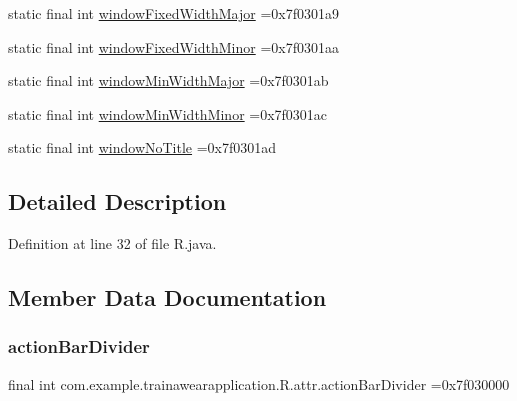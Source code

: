 \begin{DoxyCompactItemize}
\item 
static final int \mbox{\hyperlink{classcom_1_1example_1_1trainawearapplication_1_1_r_1_1attr_a777f6600986b72208b0394fcd5eedc23}{window\+Fixed\+Width\+Major}} =0x7f0301a9
\item 
static final int \mbox{\hyperlink{classcom_1_1example_1_1trainawearapplication_1_1_r_1_1attr_a6c9982d085664f162825a9fe2f119c93}{window\+Fixed\+Width\+Minor}} =0x7f0301aa
\item 
static final int \mbox{\hyperlink{classcom_1_1example_1_1trainawearapplication_1_1_r_1_1attr_a50c58fbb0c69bef0302b1a976c09da4f}{window\+Min\+Width\+Major}} =0x7f0301ab
\item 
static final int \mbox{\hyperlink{classcom_1_1example_1_1trainawearapplication_1_1_r_1_1attr_ae5a639562b2329aeae3f0f0cb8093450}{window\+Min\+Width\+Minor}} =0x7f0301ac
\item 
static final int \mbox{\hyperlink{classcom_1_1example_1_1trainawearapplication_1_1_r_1_1attr_a2b566635d5ee696b197c292fd1245839}{window\+No\+Title}} =0x7f0301ad
\end{DoxyCompactItemize}


\subsection{Detailed Description}


Definition at line 32 of file R.\+java.



\subsection{Member Data Documentation}
\mbox{\label{classcom_1_1example_1_1trainawearapplication_1_1_r_1_1attr_a4c8cb097f6c5df7a666fa452ad9951c0}} 
\subsubsection{\texorpdfstring{actionBarDivider}{actionBarDivider}}
{\footnotesize\ttfamily final int com.\+example.\+trainawearapplication.\+R.\+attr.\+action\+Bar\+Divider =0x7f030000\hspace{0.3cm}{\ttfamily [static]}}


